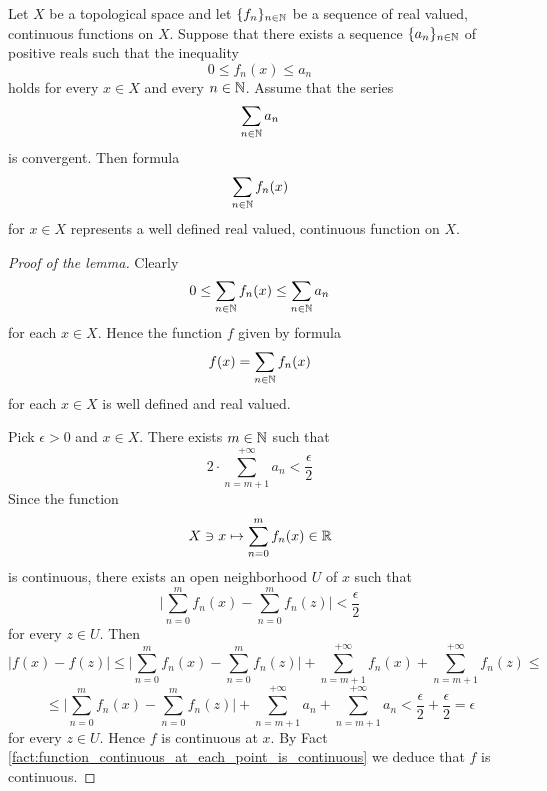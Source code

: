 \begin{lemma}\label{lemma:Weierstrass_criterion}
	Let $X$ be a topological space and let $\{f_n\}_{n\in {\mathbb N}}$ be a sequence of real valued, continuous functions on $X$. Suppose that there exists a sequence $\{a_n\}_{n \in {\mathbb N}}$ of positive reals such that the inequality 
	$$0 \leq f_n(x) \leq a_n$$
	holds for every $x \in X$ and every $n \in {\mathbb N}$. Assume that the series 
	$$\sum_{n \in {\mathbb N}}a_n$$
	is convergent. Then formula  
	$$\sum_{n\in {\mathbb N}}f_n(x)$$
	for $x \in X$ represents a well defined real valued, continuous function on $X$. 
\end{lemma}
\begin{proof}[Proof of the lemma]
	Clearly 
	$$0 \leq \sum_{n\in {\mathbb N}}f_n(x) \leq \sum_{n\in {\mathbb N}}a_n$$
	for each $x \in X$. Hence the function $f$ given by formula
	$$f(x) = \sum_{n \in {\mathbb N}}f_n(x)$$
	for each $x \in X$ is well defined and real valued.
	
	Pick $\epsilon > 0$ and $x \in X$. There exists $m \in {\mathbb N}$ such that
	$$2 \cdot \sum_{n=m + 1}^{+\infty}a_n < \frac{\epsilon}{2}$$
	Since the function 
	$$X\ni x \mapsto \sum_{n=0}^mf_n(x) \in {\mathbb R}$$
	is continuous, there exists an open neighborhood $U$ of $x$ such that 
	$$\bigg|\sum_{n=0}^mf_n(x) - \sum_{n=0}^mf_n(z)\bigg| < \frac{\epsilon}{2}$$
	for every $z \in U$. Then
	$$|f(x) - f(z)| \leq \bigg|\sum_{n=0}^mf_n(x) - \sum_{n=0}^mf_n(z)\bigg| + \sum_{n=m+1}^{+\infty}f_n(x) + \sum_{n=m+1}^{+\infty}f_n(z) \leq $$
	$$\leq \bigg|\sum_{n=0}^mf_n(x) - \sum_{n=0}^mf_n(z)\bigg| + \sum_{n=m+1}^{+\infty}a_n + \sum_{n=m+1}^{+\infty}a_n < \frac{\epsilon}{2} + \frac{\epsilon}{2} = \epsilon$$
	for every $z \in U$. Hence $f$ is continuous at $x$. By Fact \ref{fact:function_continuous_at_each_point_is_continuous} we deduce that $f$ is continuous. 
\end{proof}

